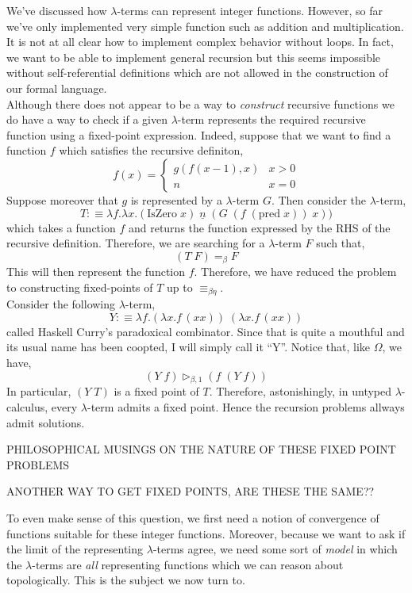 \documentclass[12pt]{article}
\newcommand{\red}{\triangleright}
\newcommand{\bredo}{\red_{\beta,1}}
\begin{document}
We've discussed how $\lambda$-terms can represent integer functions. However, so far we've only implemented very simple function such as addition and multiplication. It is not at all clear how to implement complex behavior without loops. In fact, we want to be able to implement general recursion but this seems impossible without self-referential definitions which are not allowed in the construction of our formal language. 
\bigskip\\
Although there does not appear to be a way to \textit{construct} recursive functions we do have a way to check if a given $\lambda$-term represents the required recursive function using a fixed-point expression. Indeed, suppose that we want to find a function $f$ which satisfies the recursive definiton,
\[ f(x) = 
\begin{cases}
g(f(x-1), x) & x > 0
\\
n & x = 0
\end{cases}\]
Suppose moreover that $g$ is represented by a $\lambda$-term $G$. Then consider the $\lambda$-term,
\[ T :\equiv \lambda f . \lambda x . (\text{IsZero} \; x) \; \underline{n} \; (G \; (f \; (\text{pred} \; x)) \; x)) \]
which takes a function $f$ and returns the function expressed by the RHS of the recursive definition. Therefore, we are searching for a $\lambda$-term $F$ such that,
\[ (T \; F) =_\beta F \]
This will then represent the function $f$. Therefore, we have reduced the problem to constructing fixed-points of $T$ up to $\equiv_{\beta\eta}$.  
\bigskip\\
Consider the following $\lambda$-term,
\[ Y :\equiv \lambda f. (\lambda x. f \, (x x)) \; (\lambda x. f \, (x x)) \]
called Haskell Curry's paradoxical combinator. Since that is quite a mouthful and its usual name has been coopted, I will simply call it ``Y''. 
Notice that, like $\Omega$, we have,
\[ (Y \; f) \bredo (f \; (Y \; f)) \]
In particular, $(Y \; T)$ is a fixed point of $T$. Therefore, astonishingly, in untyped $\lambda$-calculus, every $\lambda$-term admits a fixed point. Hence the recursion problems allways admit solutions. 

PHILOSOPHICAL MUSINGS ON THE NATURE OF THESE FIXED POINT PROBLEMS


ANOTHER WAY TO GET FIXED POINTS, ARE THESE THE SAME??

To even make sense of this question, we first need a notion of convergence of functions suitable for these integer functions. Moreover, because we want to ask if the limit of the representing $\lambda$-terms agree, we need some sort of \textit{model} in which the $\lambda$-terms are \textit{all} representing functions which we can reason about topologically. This is the subject we now turn to. 
\end{document}
